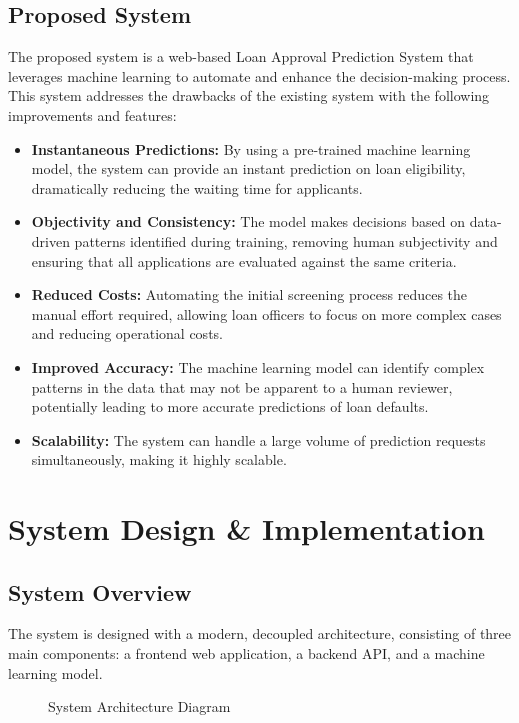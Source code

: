\documentclass{report}
\begin{document}
\section{Proposed System}
The proposed system is a web-based Loan Approval Prediction System that leverages machine learning to automate and enhance the decision-making process. This system addresses the drawbacks of the existing system with the following improvements and features:
\begin{itemize}
    \item \textbf{Instantaneous Predictions:} By using a pre-trained machine learning model, the system can provide an instant prediction on loan eligibility, dramatically reducing the waiting time for applicants.
    \item \textbf{Objectivity and Consistency:} The model makes decisions based on data-driven patterns identified during training, removing human subjectivity and ensuring that all applications are evaluated against the same criteria.
    \item \textbf{Reduced Costs:} Automating the initial screening process reduces the manual effort required, allowing loan officers to focus on more complex cases and reducing operational costs.
    \item \textbf{Improved Accuracy:} The machine learning model can identify complex patterns in the data that may not be apparent to a human reviewer, potentially leading to more accurate predictions of loan defaults.
    \item \textbf{Scalability:} The system can handle a large volume of prediction requests simultaneously, making it highly scalable.
\end{itemize}

\chapter{System Design & Implementation}

\section{System Overview}
The system is designed with a modern, decoupled architecture, consisting of three main components: a frontend web application, a backend API, and a machine learning model.

\begin{figure}[h!]
\centering
{}
\caption{System Architecture Diagram}
\end{figure}
\end{document}

